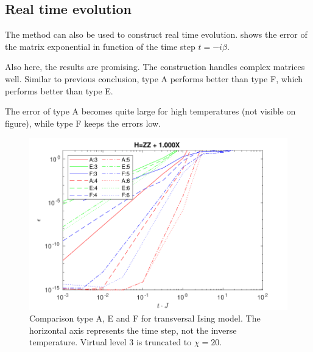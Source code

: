 




\subsection{Real time evolution} \label{subsec_rt_evo}

The method can also be used to construct real time evolution.  shows the error of the matrix exponential in function of the time step $t = -i \beta $.

Also here, the results are promising. The construction handles complex matrices well. Similar to previous conclusion, type A performs better than type F, which performs better than type E.

The error of type A becomes quite large for high temperatures (not visible on figure), while type F keeps the errors low.

\begin{figure}
    \center
    \includegraphics[width=\textwidth]{Figuren/benchmarking/1D_t_ising_time.pdf}
    \caption{Comparison type A, E and F for transversal Ising model. The horizontal axis represents the time step, not the inverse temperature. Virtual level 3 is truncated to $\chi=20$.  }
    \label{fig:benchmark:tising_time}
\end{figure}


